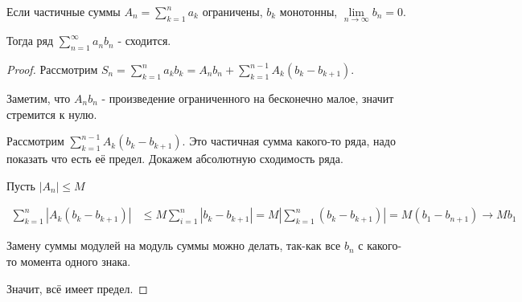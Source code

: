 \begin{theorem} \thmslashn

    Если частичные суммы $A_{n} = \sum\limits_{k=1}^{n} a_{k}$ ограничены, $b_{k}$ монотонны, $\lim\limits_{n \to \infty} b_{n} = 0$.

    Тогда ряд $\sum\limits_{n=1}^{\infty} a_{n}b_{n}$ - сходится.
    \begin{proof} \thmslashn
    
        Рассмотрим $S_{n} = \sum\limits_{k=1}^{n} a_{k}b_{k} = A_{n}b_{n} + \sum\limits_{k=1}^{n-1} A_{k}(b_{k}-b_{k+1})$.

        Заметим, что $A_{n}b_{n}$ - произведение ограниченного на бесконечно малое, значит стремится к нулю.

        Рассмотрим $\sum\limits_{k=1}^{n-1} A_{k}(b_{k}-b_{k+1})$. Это частичная сумма какого-то ряда, надо показать что есть её предел. Докажем абсолютную сходимость ряда.

        Пусть $|A_{n}| \le M$

        \begin{equation*}
            \begin{split}
                \sum\limits_{k=1}^{n} \left|A_{k}(b_{k} - b_{k+1})\right| &\le M \sum\limits_{i=1}^{n} \left|b_{k} - b_{k+1}\right| = M\left|\sum\limits_{k=1}^{n} (b_{k}-b_{k+1})\right| = M(b_{1}-b_{n+1}) \to Mb_{1}
            \end{split}
        \end{equation*}

        Замену суммы модулей на модуль суммы можно делать, так-как все $b_{n}$ с какого-то момента одного знака.

        Значит, всё имеет предел.
    \end{proof}
\end{theorem}
